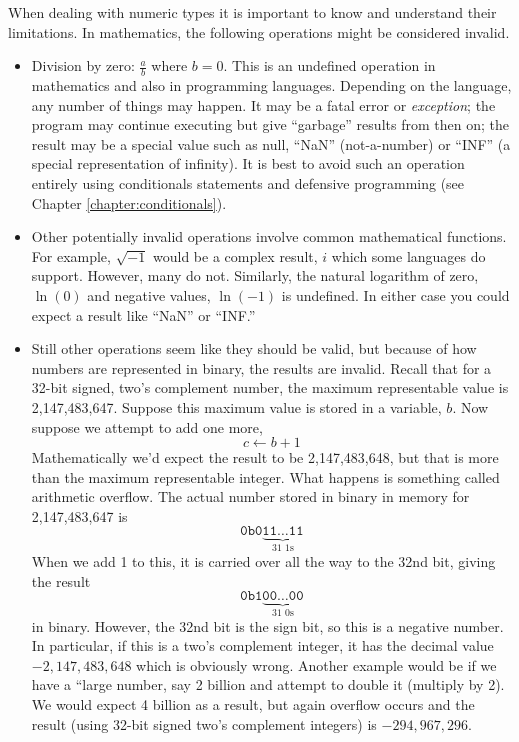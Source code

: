 When dealing with numeric types it is important to know and understand 
their limitations.  In mathematics, the following operations might be
considered invalid.
\begin{itemize}
  \item Division by zero: $\frac{a}{b}$ where $b = 0$.  This is an 
  undefined operation in mathematics and also in programming languages.
  Depending on the language, any number of things may happen.  It may 
  be a fatal error or \emph{exception}; the program may continue executing
  but give ``garbage'' results from then on; the result may be a special value
  such as null, ``NaN'' (not-a-number) or ``INF'' (a special representation of
  infinity).  It is best to avoid such an operation entirely using conditionals statements and
  \gls{defensive programming} (see Chapter \ref{chapter:conditionals}).

  \item Other potentially invalid operations involve common mathematical functions.
  For example, $\sqrt{-1}$ would be a complex result, $i$ which some languages 
  do support.  However, many do not.  Similarly, the natural logarithm of zero,
  $\ln{(0)}$ and negative values, $\ln{(-1)}$ is undefined.  In either case you could expect a result like ``NaN''
  or ``INF.''
  
  \item Still other operations seem like they should be valid, but because of how
  numbers are represented in binary, the results are invalid.  Recall that for a 
  32-bit signed, two's complement number, the maximum representable value 
  is 2,147,483,647.  Suppose this maximum value is stored in a variable, $b$.
  Now suppose we attempt to add one more, 
  	$$c \leftarrow b + 1$$
  Mathematically we'd expect the result to be 2,147,483,648, but that is more than
  the maximum representable integer.  What happens is something called arithmetic
   \gls{overflow}.  The actual number stored in binary in memory for 2,147,483,647 is
    $$\texttt{0b0}\underbrace{\texttt{11}\ldots\texttt{11}}_{\text{31 1s}}$$
  When we add 1 to this, it is carried over all the way to the 32nd bit, giving the 
  result 
    $$\texttt{0b1}\underbrace{\texttt{00}\ldots\texttt{00}}_{\text{31 0s}}$$
  in binary.  However, the 32nd bit is the sign bit, so this is a negative number.
  In particular, if this is a two's complement integer, it has the decimal value
  $-2,147,483,648$ which is obviously wrong.  Another example would be if we have a
  ``large number, say 2 billion and attempt to double it (multiply by 2).  We would
  expect 4 billion as a result, but again overflow occurs and the result (using 32-bit
  signed two's complement integers) is $-294,967,296$.


\end{itemize}
